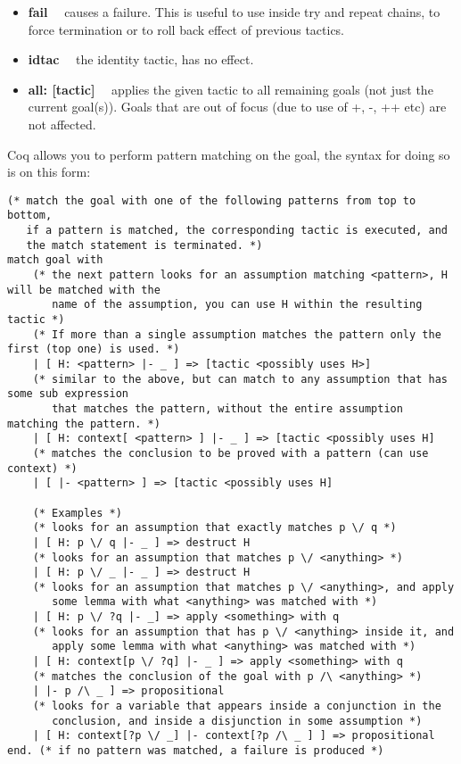 \documentclass{article}
\begin{document}
\begin{itemize}
    \item \textbf{fail} \ \ causes a failure. This is useful to use inside try and repeat chains, to force termination or to roll back effect of previous tactics.
    \item \textbf{idtac} \ \ the identity tactic, has no effect.
    \item \textbf{all: [tactic]} \ \ applies the given tactic to all remaining goals (not just the current goal(s)). Goals that are out of focus (due to use of +, -, ++ etc) are not affected.
\end{itemize}

\noindent Coq allows you to perform pattern matching on the goal, the syntax for doing so is on this form:
\begin{verbatim}
(* match the goal with one of the following patterns from top to bottom,
   if a pattern is matched, the corresponding tactic is executed, and
   the match statement is terminated. *)
match goal with
    (* the next pattern looks for an assumption matching <pattern>, H will be matched with the 
       name of the assumption, you can use H within the resulting tactic *)
    (* If more than a single assumption matches the pattern only the first (top one) is used. *)
    | [ H: <pattern> |- _ ] => [tactic <possibly uses H>]
    (* similar to the above, but can match to any assumption that has some sub expression
       that matches the pattern, without the entire assumption matching the pattern. *)
    | [ H: context[ <pattern> ] |- _ ] => [tactic <possibly uses H]
    (* matches the conclusion to be proved with a pattern (can use context) *)
    | [ |- <pattern> ] => [tactic <possibly uses H]
    
    (* Examples *)
    (* looks for an assumption that exactly matches p \/ q *)
    | [ H: p \/ q |- _ ] => destruct H
    (* looks for an assumption that matches p \/ <anything> *)
    | [ H: p \/ _ |- _ ] => destruct H
    (* looks for an assumption that matches p \/ <anything>, and apply
       some lemma with what <anything> was matched with *)
    | [ H: p \/ ?q |- _] => apply <something> with q
    (* looks for an assumption that has p \/ <anything> inside it, and
       apply some lemma with what <anything> was matched with *)
    | [ H: context[p \/ ?q] |- _ ] => apply <something> with q
    (* matches the conclusion of the goal with p /\ <anything> *)
    | |- p /\ _ ] => propositional
    (* looks for a variable that appears inside a conjunction in the
       conclusion, and inside a disjunction in some assumption *)
    | [ H: context[?p \/ _] |- context[?p /\ _ ] ] => propositional
end. (* if no pattern was matched, a failure is produced *)
\end{verbatim}
\end{document}

